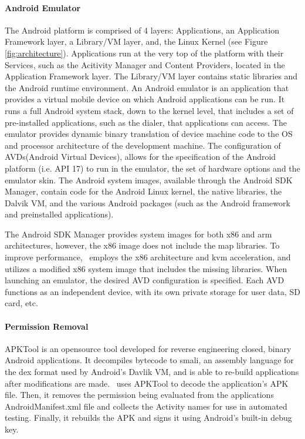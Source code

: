 \paragraph{\bfseries Android Emulator}
The Android platform is comprised of 4 layers: Applications, an Application Framework layer, a Library/VM layer, and, the Linux Kernel (see Figure \ref{fig:architecture}).  Applications run at the very top of the platform with their Services, such as the Acitivity Manager and Content Providers, located in the Application Framework layer.  The Library/VM layer contains static libraries and the Android runtime environment.  An Android emulator is an application that provides a virtual mobile device on which Android applications can be run.  It runs a full Android system stack, down to the kernel level, that includes a set of pre-installed applications, such as the dialer, that applications can access.  The emulator provides dynamic binary translation of device machine code to the OS and processor architecture of the development machine.  The configuration of AVDs(Android Virtual Devices), allows for the specification of the Android platform (i.e. API 17) to run in the emulator, the set of hardware options and the emulator skin.  The Android system images, available through the Android SDK Manager, contain code for the Android Linux kernel, the native libraries, the Dalvik VM, and the various Android packages (such as the Android framework and preinstalled applications).  



The Android SDK Manager provides system images for both x86 and arm architectures, however, the x86 image does not include the map libraries.  To improve performance, \toolname~employs the x86 architecture and kvm acceleration, and utilizes a modified x86 system image that includes the missing libraries.  When launching an emulator, the desired AVD configuration is specified.  Each AVD functions as an independent device, with its own private storage for user data, SD card, etc. 




\paragraph{\bfseries Permission Removal}
APKTool is an opensource tool developed for reverse engineering closed, binary Android applications. It decompiles bytecode to smali, an assembly language for the dex format used by Android's Davlik VM, and is able to re-build applications after modifications are made.  \toolname\ uses APKTool to decode the application's APK file.  Then, it removes the permission being evaluated from the applications AndroidManifest.xml file and collects the Activity names for use in automated testing.  Finally, it rebuilds the APK and signs it using Android's built-in debug key.



